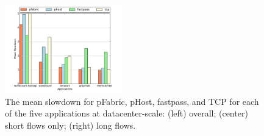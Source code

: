%
\begin{figure}
  \centering
    \includegraphics[width = 2in]{img/fig12_dcScale_slowdownsGraph} 
  \caption{\small{The mean slowdown for pFabric, pHost, fastpass, and TCP for each of the five applications at datacenter-scale: (left) overall; (center) short flows only; (right) long flows.}}
  \label{fig:phostp-ds}
\end{figure}
%

